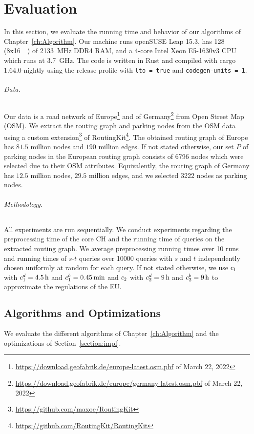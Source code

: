
\chapter{Evaluation\label{ch:Evaluation}}
In this section, we evaluate the running time and behavior of our algorithms of Chapter~\ref{ch:Algorithm}. Our machine runs openSUSE Leap 15.3, has \SI{128}{\giga\byte} (8x\SI{16}{\giga\byte}) of \SI{2133}{\mega\hertz} DDR4 RAM, and a 4-core Intel Xeon E5-1630v3 CPU which runs at \SI{3.7}{\giga\hertz}. The code is written in Rust and compiled with cargo 1.64.0-nightly using the release profile with \texttt{lto~=~true} and \texttt{codegen-units~=~1}.

\subparagraph{Data.} Our data is a road network of Europe\footnote{\url{https://download.geofabrik.de/europe-latest.osm.pbf} of March 22, 2022} and of Germany\footnote{\url{https://download.geofabrik.de/europe/germany-latest.osm.pbf} of March 22, 2022} from Open Street Map (OSM). We extract the routing graph and parking nodes from the OSM data using a custom extension\footnote{\url{https://github.com/maxoe/RoutingKit}} of RoutingKit\footnote{\url{https://github.com/RoutingKit/RoutingKit}}. The obtained routing graph of Europe has $81.5$ million nodes and $190$ million edges. If not stated otherwise, our set $P$ of parking nodes in the European routing graph consists of \num{6796} nodes which were selected due to their OSM attributes. Equivalently, the routing graph of Germany has $12.5$ million nodes, $29.5$ million edges, and we selected \num{3222} nodes as parking nodes.

\subparagraph{Methodology.} All experiments are run sequentially. We conduct experiments regarding the preprocessing time of the core CH and the running time of queries on the extracted routing graph. We average preprocessing running times over \num{10} runs and running times of $s$-$t$ queries over \num{10000} queries with $s$ and $t$ independently chosen uniformly at random for each query. If not stated otherwise, we use $c_1$ with $c_1^d = \SI{4.5}{\hour}$ and $c_1^b = \SI{0.45}{\minute}$ and $c_2$ with $c_2^d = \SI{9}{\hour}$ and $c_2^b = \SI{9}{\hour}$ to approximate the regulations of the EU.

\section{Algorithms and Optimizations}
We evaluate the different algorithms of Chapter~\ref{ch:Algorithm} and the optimizations of Section~\ref{section:impl}.

